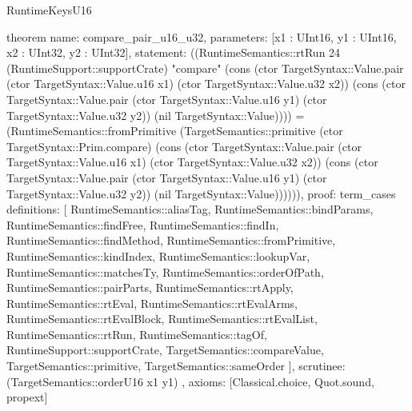 \begin{lexlean}{RuntimeKeysU16}
\begin{semanticmodule}
theorem{
  name: compare_pair_u16_u32,
  parameters: [x1 : UInt16, y1 : UInt16, x2 : UInt32, y2 : UInt32],
  statement: ((RuntimeSemantics::rtRun 24 (RuntimeSupport::supportCrate) "compare" (cons (ctor TargetSyntax::Value.pair (ctor TargetSyntax::Value.u16 x1) (ctor TargetSyntax::Value.u32 x2)) (cons (ctor TargetSyntax::Value.pair (ctor TargetSyntax::Value.u16 y1) (ctor TargetSyntax::Value.u32 y2)) (nil TargetSyntax::Value)))) = (RuntimeSemantics::fromPrimitive (TargetSemantics::primitive (ctor TargetSyntax::Prim.compare) (cons (ctor TargetSyntax::Value.pair (ctor TargetSyntax::Value.u16 x1) (ctor TargetSyntax::Value.u32 x2)) (cons (ctor TargetSyntax::Value.pair (ctor TargetSyntax::Value.u16 y1) (ctor TargetSyntax::Value.u32 y2)) (nil TargetSyntax::Value)))))),
  proof: term_cases{
    definitions: [
      RuntimeSemantics::aliasTag,
      RuntimeSemantics::bindParams,
      RuntimeSemantics::findFree,
      RuntimeSemantics::findIn,
      RuntimeSemantics::findMethod,
      RuntimeSemantics::fromPrimitive,
      RuntimeSemantics::kindIndex,
      RuntimeSemantics::lookupVar,
      RuntimeSemantics::matchesTy,
      RuntimeSemantics::orderOfPath,
      RuntimeSemantics::pairParts,
      RuntimeSemantics::rtApply,
      RuntimeSemantics::rtEval,
      RuntimeSemantics::rtEvalArms,
      RuntimeSemantics::rtEvalBlock,
      RuntimeSemantics::rtEvalList,
      RuntimeSemantics::rtRun,
      RuntimeSemantics::tagOf,
      RuntimeSupport::supportCrate,
      TargetSemantics::compareValue,
      TargetSemantics::primitive,
      TargetSemantics::sameOrder
    ],
    scrutinee: (TargetSemantics::orderU16 x1 y1)
  },
  axioms: [Classical.choice, Quot.sound, propext]
}


\end{semanticmodule}
\end{lexlean}
